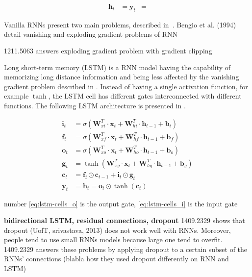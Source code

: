 \begin{align}
    \bm{h}_t &=
    \label{eq:rnn_h}
    \bm{y}_t &=
    \label{eq:rnn_y}
\end{align}

Vanilla RNNs present two main problems, described in~\citet{bengio1994learning}.
Bengio et al. (1994) detail vanishing and exploding gradient problems of RNN

1211.5063 answers exploding gradient problem with gradient clipping

Long short-term memory (LSTM) \citep{hochreiter1997lstm} is a RNN model having the capability of memorizing long distance information and being less affected by the vanishing gradient problem described in \citet{pascanu2013difficulty}. Instead of having a single activation function, for example $\tanh$, the LSTM cell has different gates interconnected with different functions. The following LSTM architecture is presented in \citet{1303.5778}.

\begin{align}
    \label{eq:lstm-cells_i}
    \bm{i}_t &= \sigma (\mathbf{W}_{xi}^{T} \cdot \bm{x}_t + \mathbf{W}_{hi}^{T} \cdot \bm{h}_{t-1} + \bm{b}_i)\\
    \label{eq:lstm-cells_f}
    \bm{f}_t &= \sigma (\mathbf{W}_{xf}^{T} \cdot \bm{x}_t + \mathbf{W}_{hf}^{T} \cdot \bm{h}_{t-1} + \bm{b}_f)\\
    \label{eq:lstm-cells_o}
    \bm{o}_t &= \sigma (\mathbf{W}_{xo}^{T} \cdot \bm{x}_t + \mathbf{W}_{ho}^{T} \cdot \bm{h}_{t-1} + \bm{b}_o)\\
    \label{eq:lstm-cells_g}
    \bm{g}_t &= \tanh (\mathbf{W}_{xg}^{T} \cdot \bm{x}_t + \mathbf{W}_{hg}^{T} \cdot \bm{h}_{t-1} + \bm{b}_g)\\
    \label{eq:lstm-cells_c}
    \bm{c}_t &= \bm{f}_t \odot \bm{c}_{t-1} + \bm{i}_t \odot \bm{g}_t\\
    \label{eq:lstm-cells_y}
    \bm{y}_t &= \bm{h}_t = \bm{o}_t \odot \tanh ( \bm{c}_t )
\end{align}

number \ref{eq:lstm-cells_o} is the output gate, \ref{eq:lstm-cells_i} is the input gate

\textbf{bidirectional LSTM, residual connections, dropout}
1409.2329 shows that dropout (UofT, srivastava, 2013) does not work well with RNNs. Moreover, people tend to use small RNNs models because large one tend to overfit. 1409.2329 answers these problems by applying dropout to a certain subset of the RNNs' connections (blabla how they used dropout differently on RNN and LSTM)

